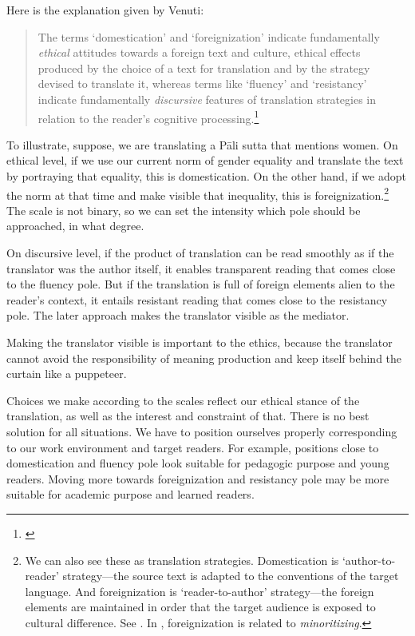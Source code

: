 Here is the explanation given by Venuti:

\begin{quote}
The terms `domestication' and `foreignization' indicate fundamentally \emph{ethical} attitudes towards a foreign text and culture, ethical effects produced by the choice of a text for translation and by the strategy devised to translate it, whereas terms like `fluency' and `resistancy' indicate fundamentally \emph{discursive} features of translation strategies in relation to the reader's cognitive processing.\footnote{\citealp[p.~19]{venuti:invisibility}}
\end{quote}

To illustrate, suppose, we are translating a P\=ali sutta that mentions women. On ethical level, if we use our current norm of gender equality and translate the text by portraying that equality, this is domestication. On the other hand, if we adopt the norm at that time and make visible that inequality, this is foreignization.\footnote{We can also see these as translation strategies. Domestication is `author-to-reader' strategy---the source text is adapted to the conventions of the target language. And foreignization is `reader-to-author' strategy---the foreign elements are maintained in order that the target audience is exposed to cultural difference. See \citealp[p.~549]{wyke:ethics}. In \citealp{venuti:scandals}, foreignization is related to \emph{minoritizing}.} The scale is not binary, so we can set the intensity which pole should be approached, in what degree.

On discursive level, if the product of translation can be read smoothly as if the translator was the author itself, it enables transparent reading that comes close to the fluency pole. But if the translation is full of foreign elements alien to the reader's context, it entails resistant reading that comes close to the resistancy pole. The later approach makes the translator visible as the mediator.

Making the translator visible is important to the ethics, because the translator cannot avoid the responsibility of meaning production and keep itself behind the curtain like a puppeteer.

Choices we make according to the scales reflect our ethical stance of the translation, as well as the interest and constraint of that. There is no best solution for all situations. We have to position ourselves properly corresponding to our work environment and target readers. For example, positions close to domestication and fluency pole look suitable for pedagogic purpose and young readers. Moving more towards foreignization and resistancy pole may be more suitable for academic purpose and learned readers.
